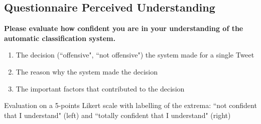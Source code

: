 \subsection{Questionnaire Perceived Understanding}
\textbf{Please evaluate how confident you are in your understanding of the automatic classification system.}
\begin{enumerate}
	\item The decision (``offensive", ``not offensive") the system made for a single Tweet	
	\item The reason why the system made the decision	
	\item The important factors that contributed to the decision
\end{enumerate}
Evaluation on a 5-points Likert scale with labelling of the extrema: ``not confident that I understand" (left) and ``totally confident that I understand" (right)



